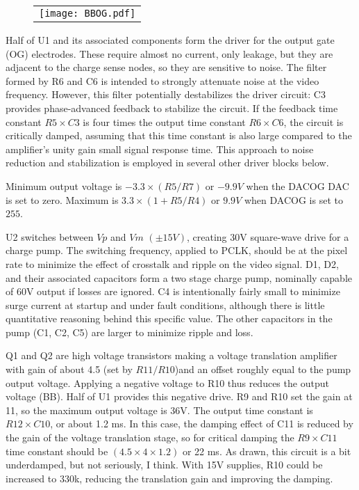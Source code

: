 \documentclass[a4paper,12pt]{article}
\begin{document}
   \begin{figure}
   \begin{center}
   \begin{tabular}{c}
   \texttt{[image: BBOG.pdf]}
   \end{tabular}
   \end{center}
   \end{figure}
Half of U1 and its associated components form the driver for the output gate (OG) electrodes. These require almost no current, only leakage, but they are adjacent to the charge sense nodes, so they are sensitive to noise. The filter formed by R6 and C6 is intended to strongly attenuate noise at the video frequency. However, this filter potentially destabilizes the driver circuit: C3 provides phase-advanced feedback to stabilize the circuit. If the feedback time constant $R5\times C3$ is four times the output time constant $R6\times C6$, the circuit is critically damped, assuming that this time constant is also large compared to the amplifier's unity gain small signal response time. This approach to noise reduction and stabilization is employed in several other driver blocks below.

Minimum output voltage is $-3.3\times(R5/R7)$ or $-9.9V$ when the DACOG DAC is set to zero. Maximum is $3.3\times(1+R5/R4)$ or $9.9V$ when DACOG is set to $255$.

U2 switches between $Vp$ and $Vm$ $(\pm15V)$, creating 30V square-wave drive for a charge pump. The switching frequency, applied to PCLK, should be at the pixel rate to minimize the effect of crosstalk and ripple on the video signal. D1, D2, and their associated capacitors form a two stage charge pump, nominally capable of 60V output if losses are ignored. C4 is intentionally fairly small to minimize surge current at startup and under fault conditions, although there is little quantitative reasoning behind this specific value. The other capacitors in the pump (C1, C2, C5) are larger to minimize ripple and loss.

Q1 and Q2 are high voltage transistors making a voltage translation amplifier with gain of about 4.5 (set by $R11/R10$)and an offset roughly equal to the pump output voltage. Applying a negative voltage to R10 thus reduces the output voltage (BB). Half of U1 provides this negative drive. R9 and R10 set the gain at 11, so the maximum output voltage is 36V. The output time constant is $R12\times C10$, or about 1.2 ms. In this case, the damping effect of C11 is reduced by the gain of the voltage translation stage, so for critical damping the $R9\times C11$ time constant should be $(4.5\times4\times1.2)$ or 22 ms. As drawn, this circuit is a bit underdamped, but not seriously, I think. With 15V supplies, R10 could be increased to 330k, reducing the translation gain and improving the damping.
\end{document}
